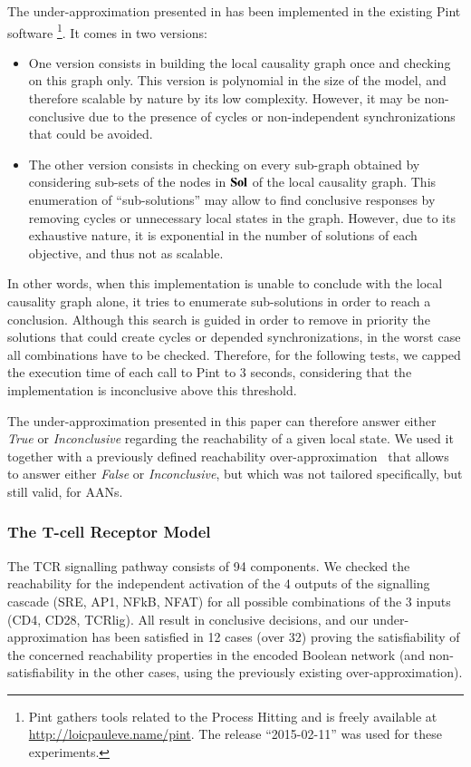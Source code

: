 The under-approximation presented in  has been implemented
in the existing Pint software%
\footnote{Pint gathers tools related to the Process Hitting
and is freely available at \url{http://loicpauleve.name/pint}.
The release “2015-02-11” was used for these experiments.}.
It comes in two versions:
\begin{itemize}
  \item One version consists in building the local causality graph once
    and checking  on this graph only.
    This version is polynomial in the size of the model,
    and therefore scalable by nature by its low complexity.
    However, it may be non-conclusive due to the presence of cycles
    or non-independent synchronizations that could be avoided.
  \item The other version consists in checking 
    on every sub-graph obtained by considering sub-sets of the nodes in $\mathbf{Sol}$
    of the local causality graph.
    This enumeration of “sub-solutions” may allow to find conclusive
    responses by removing cycles or unnecessary local states in the graph.
    However, due to its exhaustive nature,
    it is exponential in the number of solutions of each objective,
    and thus not as scalable.
\end{itemize}
In other words, when this implementation is unable to conclude with the
local causality graph alone, it tries to enumerate sub-solutions
in order to reach a conclusion.
Although this search is guided in order to remove in priority
the solutions that could create cycles or depended synchronizations,
in the worst case all combinations have to be checked.
Therefore, for the following tests, we capped the execution time
of each call to Pint to 3 seconds,
considering that the implementation is inconclusive above this threshold.

The under-approximation presented in this paper can therefore answer
either \emph{True} or \emph{Inconclusive} regarding the reachability
of a given local state.
We used it together with a previously defined
reachability over-approximation~\cite{PMR12-MSCS}
that allows to answer either \emph{False} or \emph{Inconclusive},
but which was not tailored specifically, but still valid, for AANs.

\subsubsection*{The T-cell Receptor Model}

The TCR signalling pathway consists of 94 components.
We checked the reachability for the independent activation of
the 4 outputs of the signalling cascade (SRE, AP1, NFkB, NFAT)
for all possible combinations of the 3 inputs (CD4, CD28, TCRlig).
All result in conclusive decisions,
and our under-approximation has been satisfied in 12 cases (over
32) proving the satisfiability of the concerned reachability properties in the encoded Boolean network
(and non-satisfiability in the other cases, using the previously existing over-approximation).

